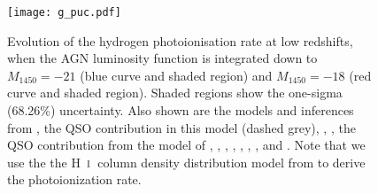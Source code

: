 \documentclass[fleqn,usenatbib]{mnras}
\def\HI{\hbox{H~$\scriptstyle\rm I$}}
\begin{document}
      \begin{figure}
        \begin{center}
          \texttt{[image: g\_puc.pdf]}
        \end{center}
        \caption{Evolution of the hydrogen photoionisation rate at low
          redshifts, when the AGN luminosity function is integrated down to
          $M_{1450}=-21$ (blue curve and shaded region) and $M_{1450}=-18$
          (red curve and shaded region).  Shaded regions show the one-sigma
          (68.26\%) uncertainty.  Also shown are the models and inferences
          from \citet[dotted brown curve]{2012ApJ...746..125H}, the QSO
          contribution in this model (dashed grey), \citet[dotted
            green]{2015ApJ...813L...8M}, \citet[dashed
            black]{2015ApJ...811....3S}, the QSO contribution from the model
          of \citet[dashed orange]{2015MNRAS.451L..30K}, \citet[dotted
            grey]{2017ApJ...837..106O}, \citet[dashed
            brown]{2018arXiv180104931P}, \citet[yellow
            box]{2017MNRAS.467.4802F}, \citet[black
            box]{2017MNRAS.467L..86V}, \citet[inverted
            triangle]{2013MNRAS.436.1023B},
          \citet[pentagon]{2014ApJ...789L..32K}, and
          \citet[circle]{2017MNRAS.467.3172G}. Note that we use the the
          \HI\ column density distribution model from
          \citet{2012ApJ...746..125H} to derive the photoionization rate.
          \label{fig:puc}}
      \end{figure}
\end{document}

